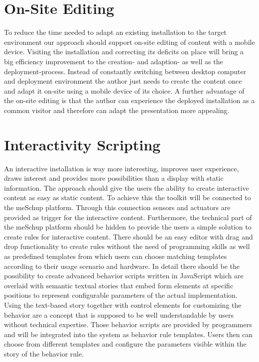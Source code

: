 \section{On-Site Editing}
To reduce the time needed to adapt an existing installation to the target environment our approach should support on-site editing of content with a mobile device. Visiting the installation and correcting its deficits on place will bring a big efficiency improvement to the creation- and adaption- as well as the deployment-process. Instead of constantly switching between desktop computer and deployment environment the author just needs to create the content once and adapt it on-site using a mobile device of its choice. A further advantage of the on-site editing is that the author can experience the deployed installation as a common visitor and therefore can adapt the presentation more appealing. 

\section{Interactivity Scripting}
An interactive installation is way more interesting, improves user experience, draws interest and provides more possibilities than a display with static information. The approach should give the users the ability to create interactive content as easy as static content. To achieve this the toolkit will be connected to the meSchup platform. Through this connection sensors and actuators are provided as trigger for the interactive content. Furthermore, the technical part of the meSchup platform should be hidden to provide the users a simple solution to create rules for interactive content. There should be an easy editor with drag and drop functionality to create rules without the need of programming skills as well as predefined templates from which users can choose matching templates according to their usage scenario and hardware. In detail there should be the possibility to create advanced behavior scripts written in JavaScript which are overlaid with semantic textual stories that embed form elements at specific positions to represent configurable parameters of the actual implementation. Using the text-based story together with control elements for customizing the behavior are a concept that is supposed to be well understandable by users without technical expertise. Those behavior scripts are provided by programmers and will be integrated into the system as behavior rule templates. Users then can choose from different templates and configure the parameters visible within the story of the behavior rule.

